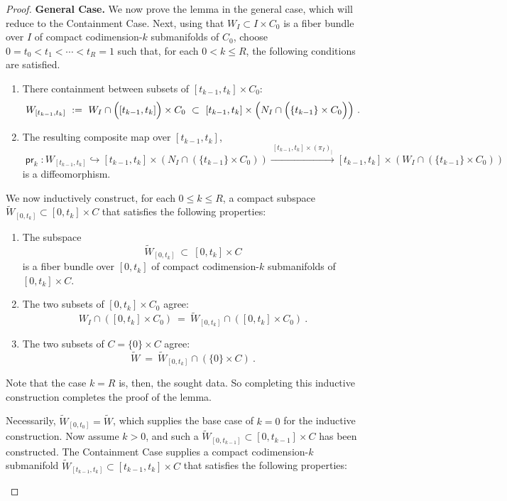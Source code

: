 \documentclass[10pt,a4paper]{amsart}
\DeclareMathOperator{\pr}{\mathsf{pr}}
\newcommand{\w}{\widetilde}
\newcommand{\xra}{\xrightarrow}
\begin{document}
\begin{proof}
{\bf General Case.}
We now prove the lemma in the general case, which will reduce to the Containment Case.
Next, using that $W_I \subset I \times C_0$ is a fiber bundle over $I$ of compact codimension-$k$ submanifolds of $C_0$, choose $0=t_0<t_1<\cdots<t_R=1$ such that, for each $0<k\leq R$, the following conditions are satisfied.
\begin{enumerate}
    \item There containment between subsets of $[t_{k-1},t_k] \times C_0$:
    \[
    W_{[t_{k-1},t_k]}
    ~:=~
    W_I \cap \Bigl( \left[t_{k-1},t_k \right]\Bigr) \times C_0
    ~\subset~
    \left[t_{k-1},t_k\right] \times \Bigl(N_I \cap \Bigl(\left\{t_{k-1} \right\} \times C_0\Bigr) \Bigr)
    ~.
    \]

    \item The resulting composite map over $[t_{k-1},t_k]$,
    \[
    \pr_k
    \colon 
    W_{[t_{k-1},t_k]}
    \hookrightarrow
    [t_{k-1},t_k] \times ( N_I \cap ( \{t_{k-1}\} \times C_0 ) )
    \xra{~[t_{k-1},t_k] \times (\pi_I)_{|}~}
    [t_{k-1},t_k] \times ( W_I \cap ( \{t_{k-1}\} \times C_0 ) )
    \]
    is a diffeomorphism.
\end{enumerate}
We now inductively construct, for each $0\leq k\leq R$, a compact subspace $\w{W}_{[0,t_k]} \subset [0,t_k] \times C$ 
that satisfies the following properties:
\begin{enumerate}

    \item The subspace
    \[
    \w{W}_{[0,t_k]}
    ~\subset~
    [0,t_k] \times C
    \]
    is a fiber bundle over $[0,t_k]$ of compact codimension-$k$ submanifolds of $[0,t_k] \times C$.
    
    \item The two subsets of $[0,t_k] \times C_0$ agree:
    \[
    W_I \cap ([0,t_k] \times C_0)
    ~=~
    \w{W}_{[0,t_k]} \cap ([0,t_k] \times C_0) 
    ~.
    \]

    \item The two subsets of $C = \{0\} \times C$ agree:
    \[
    \w{W}
    ~=~
    \w{W}_{[0,t_k]} \cap (\{0\} \times C) 
    ~.
    \]
    
\end{enumerate}
Note that the case $k=R$ is, then, the sought data.
So completing this inductive construction completes the proof of the lemma.


Necessarily, $\w{W}_{[0,t_0]} = \w{W}$, which supplies the base case of $k=0$ for the inductive construction.
Now assume $k>0$, and such a $\w{W}_{[0,t_{k-1}]} \subset [0,t_{k-1}] \times C$ has been constructed.  
The Containment Case supplies a compact codimension-$k$ submanifold $\w{W}_{[t_{k-1},t_k]} \subset [t_{k-1},t_k] \times C$ that satisfies the following properties:
\begin{enumerate}


\end{enumerate}
\end{proof}
\end{document}
